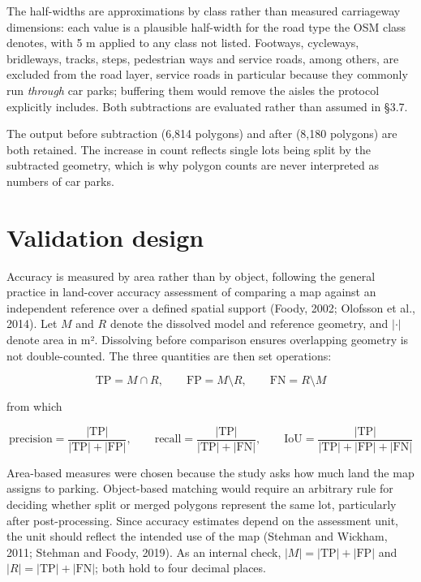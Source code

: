 The half-widths are approximations by class rather than measured carriageway dimensions: each value is a plausible half-width for the road type the OSM class denotes, with 5 m applied to any class not listed. Footways, cycleways, bridleways, tracks, steps, pedestrian ways and service roads, among others, are excluded from the road layer, service roads in particular because they commonly run \emph{through} car parks; buffering them would remove the aisles the protocol explicitly includes. Both subtractions are evaluated rather than assumed in §3.7.

The output before subtraction (6,814 polygons) and after (8,180 polygons) are both retained. The increase in count reflects single lots being split by the subtracted geometry, which is why polygon counts are never interpreted as numbers of car parks.

\hypertarget{validation-design}{%
\section{Validation design}\label{validation-design}}

Accuracy is measured by area rather than by object, following the general practice in land-cover accuracy assessment of comparing a map against an independent reference over a defined spatial support (Foody, 2002; Olofsson et al., 2014). Let \(M\) and \(R\) denote the dissolved model and reference geometry, and \(|\cdot|\) denote area in m². Dissolving before comparison ensures overlapping geometry is not double-counted. The three quantities are then set operations:

\[
\mathrm{TP} = M \cap R, \qquad \mathrm{FP} = M \setminus R, \qquad \mathrm{FN} = R \setminus M
\]

from which

\[
\text{precision} = \frac{|\mathrm{TP}|}{|\mathrm{TP}| + |\mathrm{FP}|}, \qquad
\text{recall} = \frac{|\mathrm{TP}|}{|\mathrm{TP}| + |\mathrm{FN}|}, \qquad
\text{IoU} = \frac{|\mathrm{TP}|}{|\mathrm{TP}| + |\mathrm{FP}| + |\mathrm{FN}|}
\]

Area-based measures were chosen because the study asks how much land the map assigns to parking. Object-based matching would require an arbitrary rule for deciding whether split or merged polygons represent the same lot, particularly after post-processing. Since accuracy estimates depend on the assessment unit, the unit should reflect the intended use of the map (Stehman and Wickham, 2011; Stehman and Foody, 2019). As an internal check, \(|M| = |\mathrm{TP}| + |\mathrm{FP}|\) and \(|R| = |\mathrm{TP}| + |\mathrm{FN}|\); both hold to four decimal places.

